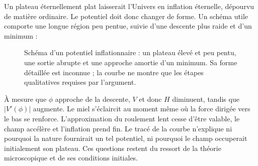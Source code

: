 Un plateau éternellement plat laisserait l’Univers en inflation éternelle, dépourvu de matière ordinaire. Le potentiel doit donc changer de forme. Un schéma utile comporte une longue région peu pentue, suivie d’une descente plus raide et d’un minimum :
\begin{figure}[htbp]
\centering
\begin{coursefitfigure}
\end{coursefitfigure}
\caption{Schéma d’un potentiel inflationnaire : un plateau élevé et peu pentu, une sortie abrupte et une approche amortie d’un minimum. Sa forme détaillée est inconnue ; la courbe ne montre que les étapes qualitatives requises par l’argument.}
\label{fig:c09-inflation-potential}
\end{figure}

À mesure que \(\phi\) approche de la descente, \(V\) et donc \(H\) diminuent, tandis que \(\lvert V'(\phi)\rvert\) augmente. Le miel s’éclaircit au moment même où la force dirigée vers le bas se renforce. L’approximation du roulement lent cesse d’être valable, le champ accélère et l’inflation prend fin. Le tracé de la courbe n’explique ni pourquoi la nature fournirait un tel potentiel, ni pourquoi le champ occuperait initialement son plateau. Ces questions restent du ressort de la théorie microscopique et de ses conditions initiales.

\begin{classroomqa}
\end{classroomqa}

